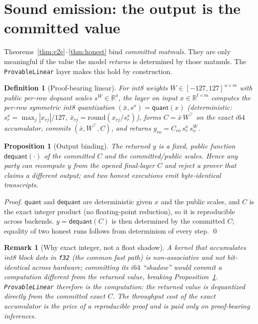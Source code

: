 \documentclass[11pt]{article}
\newtheorem{proposition}[theorem]{Proposition}
\newtheorem{definition}{Definition}
\newtheorem{remark}{Remark}
\begin{document}
\section{Sound emission: the output is the committed value}\label{sec:forward}

Theorems~\ref{thm:e2e}--\ref{thm:honest} bind \emph{committed matmuls}. They are only meaningful if the
value the model \emph{returns} is determined by those matmuls. The \texttt{ProvableLinear} layer makes
this hold by construction.

\begin{definition}[Proof-bearing linear]
For int8 weights $W\in[-127,127]^{\,o\times m}$ with public per-row dequant scales $s^W\in\mathbb{R}^o$,
the layer on input $x\in\mathbb{R}^{t\times m}$ computes the per-row symmetric int8 quantization
$(\bar x, s^x)=\mathsf{quant}(x)$ (deterministic: $s^x_r=\max_j|x_{rj}|/127$,
$\bar x_{rj}=\mathrm{round}(x_{rj}/s^x_r)$), forms $C=\bar x\,W^\top$ on the exact $i64$ accumulator,
commits $(\bar x, W^\top, C)$, and returns $y_{ro}=C_{ro}\,s^x_r\,s^W_o$.
\end{definition}

\begin{proposition}[Output binding]\label{prop:output}
The returned $y$ is a fixed, public function $\mathsf{dequant}(\cdot)$ of the committed $C$ and the
committed/public scales. Hence any party can recompute $y$ from the opened final-layer $C$ and reject
a prover that claims a different output; and two honest executions emit byte-identical transcripts.
\end{proposition}
\begin{proof}
$\mathsf{quant}$ and $\mathsf{dequant}$ are deterministic given $x$ and the public scales, and $C$ is
the exact integer product (no floating-point reduction), so it is reproducible across backends.
$y=\mathsf{dequant}(C)$ is then determined by the committed $C$; equality of two honest runs follows
from determinism of every step. \qed
\end{proof}

\begin{remark}[Why exact integer, not a float shadow]
A kernel that accumulates int8 block dots in \texttt{f32} (the common fast path) is non-associative and
not bit-identical across hardware; committing its $i64$ ``shadow'' would commit a computation different
from the returned value, breaking Proposition~\ref{prop:output}. \texttt{ProvableLinear} therefore
\emph{is} the computation: the returned value is dequantized directly from the committed exact $C$. The
throughput cost of the exact accumulator is the price of a reproducible proof and is paid only on
proof-bearing inferences.
\end{remark}
\end{document}
